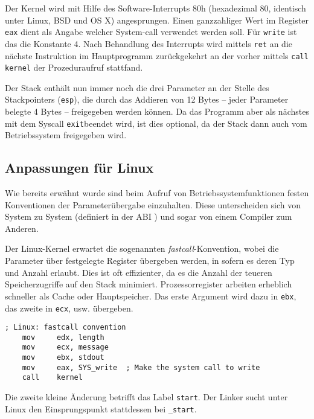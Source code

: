 Der Kernel wird mit Hilfe des Software-Interrupts 80h (hexadezimal 80, identisch unter Linux, BSD und OS X) angesprungen. Einen ganzzahliger Wert im Register \texttt{eax} dient als Angabe welcher System-call verwendet werden soll. Für {\tt write} ist das die Konstante 4. Nach Behandlung des Interrupts wird mittels \texttt{ret} an die nächste Instruktion im Hauptprogramm zurückgekehrt an der vorher mittels \texttt{call kernel} der Prozeduraufruf stattfand.

Der Stack enthält nun immer noch die drei Parameter an der Stelle des Stackpointers ({\tt esp}), die durch das Addieren von 12 Bytes – jeder Parameter belegte 4 Bytes – freigegeben werden können. Da das Programm aber als nächstes mit dem Syscall \texttt{exit}beendet wird, ist dies optional, da der Stack dann auch vom Betriebssystem freigegeben wird.


\subsection{Anpassungen für Linux}

Wie bereits erwähnt wurde sind beim Aufruf von Betriebssystemfunktionen festen Konventionen \cite{wp:callconv} der Parameterübergabe einzuhalten. Diese unterscheiden sich von System zu System (definiert in der ABI \cite{wp:abi}) und sogar von einem Compiler zum Anderen.

Der Linux-Kernel erwartet die sogenannten \emph{fastcall}-Konvention, wobei die Parameter über festgelegte Register übergeben werden, in sofern es deren Typ und Anzahl erlaubt. Dies ist oft effizienter, da es die Anzahl der teueren Speicherzugriffe auf den Stack minimiert. Prozessorregister arbeiten erheblich schneller als Cache oder Hauptspeicher. Das erste Argument wird dazu in {\tt ebx}, das zweite in {\tt ecx}, usw. übergeben.

\begin{lstlisting}[caption=Linux-Kernel Aufrufkonvention]
    ; Linux: fastcall convention
    mov     edx, length
    mov     ecx, message
    mov     ebx, stdout
    mov     eax, SYS_write  ; Make the system call to write
    call    kernel
\end{lstlisting}

Die zweite kleine Änderung betrifft das Label {\tt start}. Der Linker sucht unter Linux den Einsprungspunkt stattdessen bei {\tt \_start}.

